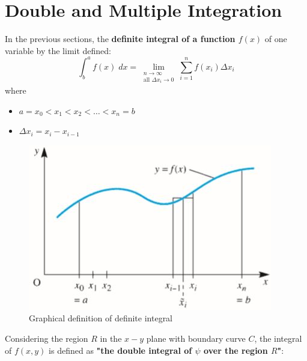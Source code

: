 \documentclass[10pt,a4paper]{article}
\begin{document}
\section{Double and Multiple Integration}

In the previous sections, the \textbf{definite integral of a function $f(x)$} of one variable by the limit
defined:
$$
    \int_b^a f(x)\; dx = \lim_{\substack{n\rightarrow\infty \\ \text{all }\Delta x_i \rightarrow 0}} \sum_{i=1}^n f(x_i)\Delta x_i
$$
where \begin{itemize}
    \item $a=x_0<x_1<x_2<\dots<x_n = b$
    \item $\Delta x_i = x_i - x_{i-1}$
\end{itemize}

\begin{figure} [h!]
    \centering
    \includegraphics[scale=0.6]{Integral.JPG}
    \caption{Graphical definition of definite integral}
\end{figure}

Considering the region $R$ in the $x-y$ plane with boundary curve $C$, the integral of $f(x,y)$ is
defined as \textbf{"the double integral of $\psi$ over the region $R$"}:
\end{document}
